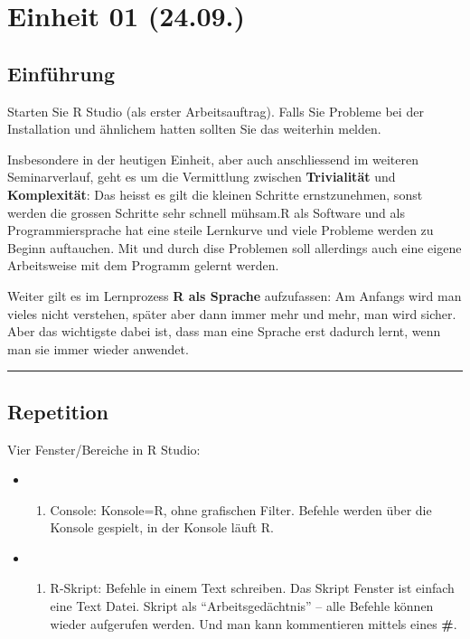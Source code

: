 \documentclass[
]{book}
\providecommand{\tightlist}{%
  \setlength{\itemsep}{0pt}\setlength{\parskip}{0pt}}
\begin{document}
\hypertarget{einheit-01-24.09.}{%
\chapter{Einheit 01 (24.09.)}\label{einheit-01-24.09.}}

\hypertarget{einfuxfchrung}{%
\section{Einführung}\label{einfuxfchrung}}

Starten Sie R Studio (als erster Arbeitsauftrag). Falls Sie Probleme bei der Installation und ähnlichem hatten sollten Sie das weiterhin melden.

Insbesondere in der heutigen Einheit, aber auch anschliessend im weiteren Seminarverlauf, geht es um die Vermittlung zwischen \textbf{Trivialität} und \textbf{Komplexität}: Das heisst es gilt die kleinen Schritte ernstzunehmen, sonst werden die grossen Schritte sehr schnell mühsam.R als Software und als Programmiersprache hat eine steile Lernkurve und viele Probleme werden zu Beginn auftauchen. Mit und durch dise Problemen soll allerdings auch eine eigene Arbeitsweise mit dem Programm gelernt werden.

Weiter gilt es im Lernprozess \textbf{R als Sprache} aufzufassen: Am Anfangs wird man vieles nicht verstehen, später aber dann immer mehr und mehr, man wird sicher. Aber das wichtigste dabei ist, dass man eine Sprache erst dadurch lernt, wenn man sie immer wieder anwendet.

\begin{center}\rule{0.5\linewidth}{0.5pt}\end{center}

\hypertarget{repetition}{%
\section{Repetition}\label{repetition}}

Vier Fenster/Bereiche in R Studio:

\begin{itemize}
\item
  \begin{enumerate}
  \def\labelenumi{\arabic{enumi}.}
  \tightlist
  \item
    Console: Konsole=R, ohne grafischen Filter. Befehle werden über die Konsole gespielt, in der Konsole läuft R.
  \end{enumerate}
\item
  \begin{enumerate}
  \def\labelenumi{\arabic{enumi}.}
  \setcounter{enumi}{1}
  \tightlist
  \item
    R-Skript: Befehle in einem Text schreiben. Das Skript Fenster ist einfach eine Text Datei. Skript als ``Arbeitsgedächtnis'' -- alle Befehle können wieder aufgerufen werden. Und man kann
    kommentieren mittels eines \textbf{\#}.
  \end{enumerate}
\end{itemize}
\end{document}
